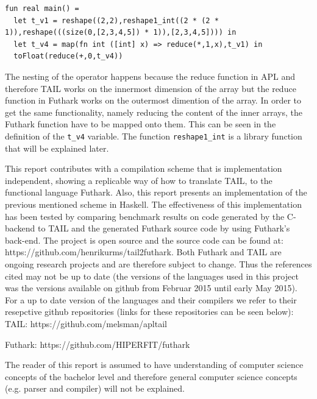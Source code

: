 \documentclass[11pt]{article}
\begin{document}
\begin{lstlisting}[numbers=none,frame=none,breaklines=true,language=Futhark]
fun real main() =
  let t_v1 = reshape((2,2),reshape1_int((2 * (2 * 1)),reshape(((size(0,[2,3,4,5]) * 1)),[2,3,4,5]))) in
  let t_v4 = map(fn int ([int] x) => reduce(*,1,x),t_v1) in
  toFloat(reduce(+,0,t_v4))
\end{lstlisting}

The nesting of the operator happens because the reduce function in APL and therefore TAIL works on the innermost dimension of the array but the reduce function in Futhark works on the outermost dimention of the array. In order to get the same functionality, namely reducing the content of the inner arrays, the Futhark function have to be mapped onto them. This can be seen in the definition of the {\tt t\_v4} variable. 
The function {\tt reshape1\_int} is a library function that will be explained later. 

This report contributes with a compilation scheme that is implementation independent, showing a replicable 
way of how to translate TAIL, to the functional language Futhark. Also, 
this report presents an implementation of the previous mentioned scheme in Haskell.
The effectiveness of this implementation has been tested by comparing benchmark results on code generated by the C-backend to TAIL 
and the generated Futhark source code by using Futhark's back-end.
The project is open source and the source code can be found at:\\ https://github.com/henrikurms/tail2futhark.
Both Futhark and TAIL are ongoing research projects and are therefore subject to change. Thus the references cited may not be up to date (the versions of the languages used in this project was the versions available on github from Februar 2015 until early May 2015). For a up to date version of the languages and their compilers we refer to their resepctive github repositories (links for these repositories can be seen below): \\

TAIL: https://github.com/melsman/apltail

Futhark: https://github.com/HIPERFIT/futhark

The reader of this report is assumed to have understanding of computer science concepts of the bachelor level and therefore general computer science concepts (e.g. parser and compiler) will not be explained. 
\end{document}
